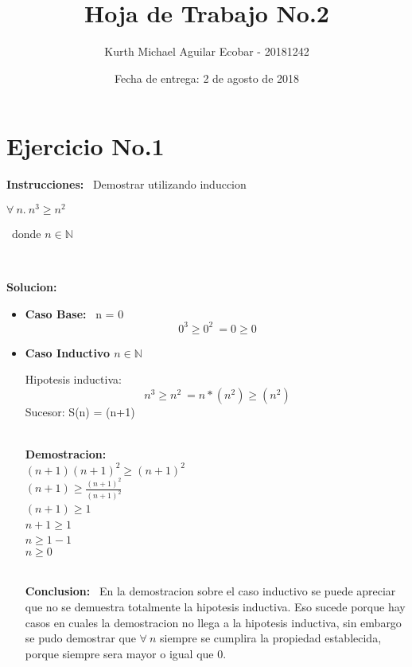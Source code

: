 \documentclass[10pt,a4paper]{article}
\begin{document}
\title{Hoja de Trabajo No.2}
\author{Kurth Michael Aguilar Ecobar - 20181242}
\date{Fecha de entrega: 2 de agosto de 2018}
\maketitle
\section*{Ejercicio No.1}
\begin{large}
\textbf{Instrucciones:} \ {Demostrar utilizando induccion}  
\end{large}
\begin{center}
$
	\forall\ n.\ n^3\geq n^2
$
\end{center}
\ donde $n\in\mathbb{N}$

\
\\\begin{large}
\textbf{Solucion:}
\end{large}

\begin{itemize}
\item \textbf{Caso Base:} \ n = 0
 \[ \ 0^{3}\geq 0^{2}\ = 0\geq 0 \]

\item \textbf{Caso Inductivo $n\in\mathbb{N}$}

 Hipotesis inductiva: \[
        \ n^3\geq n^2 \ = n*(n^2)\geq (n^2)
\]
 Sucesor: S(n) = (n+1) 
 
\
\\\textbf{Demostracion:}
\
\\ $ (n+1)(n+1)^2\geq (n+1)^2 $ 
\
\\ $ (n+1)\geq \frac{(n+1)^2}{(n+1)^2}$
\
\\ $ (n+1)\geq 1$
\
\\ $ n+1\geq 1 $
\
\\ $ n\geq 1-1 $
\
\\ $ n\geq 0 $ 

\
\\\textbf{Conclusion:}
\ En la demostracion sobre el caso inductivo se puede apreciar que no se demuestra totalmente la hipotesis inductiva. Eso sucede porque hay casos en cuales la demostracion no llega a la hipotesis inductiva, sin embargo se pudo demostrar que $ \forall\ n$ siempre se cumplira la propiedad establecida, porque siempre sera mayor o igual que 0. 



\end{itemize}
\end{document}

